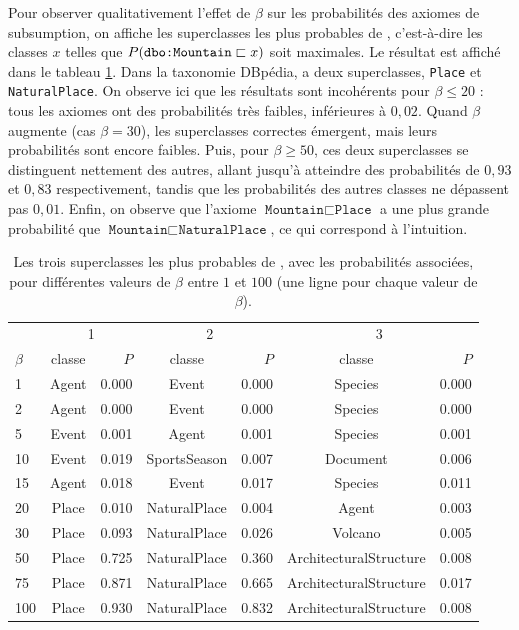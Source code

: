 Pour observer qualitativement l'effet de $\beta$ sur les probabilités des axiomes de subsumption, on affiche les superclasses les plus probables de , c'est-à-dire les classes $x$ telles que  $P(\texttt{dbo:Mountain} \sqsubset x)$ soit maximales. Le résultat est affiché dans le tableau \ref{tab:hp-most-prob-axioms}. Dans la taxonomie DBpédia,  a deux superclasses, \texttt{Place} et \texttt{NaturalPlace}. On observe ici que les résultats sont incohérents pour $\beta \leq 20$ : tous les axiomes ont des probabilités très faibles, inférieures à $0,02$. Quand $\beta$ augmente (cas $\beta = 30$), les superclasses correctes émergent, mais leurs probabilités sont encore faibles. Puis, pour $\beta \geq 50$, ces deux superclasses se distinguent nettement des autres, allant jusqu'à atteindre des probabilités de $0,93$ et $0,83$ respectivement, tandis que les probabilités des autres classes ne dépassent pas $0,01$. Enfin, on observe que l'axiome $\texttt{Mountain} \sqsubset \texttt{Place}$ a une plus grande probabilité que $\texttt{Mountain} \sqsubset \texttt{NaturalPlace}$, ce qui correspond à l'intuition. %

\begin{table}[h]
    \centering
    \caption[Prédiction de superclasses pour différentes valeurs de $\beta$]{Les trois superclasses les plus probables de , avec les probabilités associées, pour différentes valeurs de $\beta$ entre $1$ et $100$ (une ligne pour chaque valeur de $\beta$).}
    \begin{tabular}{|l|cr|cr|cr|}
    \hline
    & \multicolumn{2}{c|}{1} & \multicolumn{2}{c|}{2} & \multicolumn{2}{c|}{3} \\
$\beta$	&	classe	&	$P$	&	classe	&	$P$	&	classe	&	$P$  \\ 
\hline
1	&	Agent	&	0.000	&	Event	&	0.000	&	Species	&	0.000  \\ 
2	&	Agent	&	0.000	&	Event	&	0.000	&	Species	&	0.000  \\ 
5	&	Event	&	0.001	&	Agent	&	0.001	&	Species	&	0.001  \\ 
10	&	Event	&	0.019	&	SportsSeason	&	0.007	&	Document	&	0.006  \\ 
15	&	Agent	&	0.018	&	Event	&	0.017	&	Species	&	0.011  \\ 
20	&	Place	&	0.010	&	NaturalPlace	&	0.004	&	Agent	&	0.003  \\ 
30	&	Place	&	0.093	&	NaturalPlace	&	0.026	&	Volcano	&	0.005  \\ 
50	&	Place	&	0.725	&	NaturalPlace	&	0.360	&	ArchitecturalStructure	&	0.008  \\ 
75	&	Place	&	0.871	&	NaturalPlace	&	0.665	&	ArchitecturalStructure	&	0.017  \\ 
100	&	Place	&	0.930	&	NaturalPlace	&	0.832	&	ArchitecturalStructure	&	0.008  \\ 
\hline
    \end{tabular}
    \label{tab:hp-most-prob-axioms}
\end{table}


